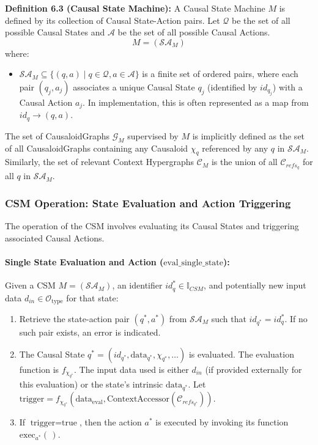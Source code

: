 \noindent\textbf{Definition 6.3 (Causal State Machine):} A Causal State Machine \( M \) is defined by its collection of Causal State-Action pairs. Let \(\mathcal{Q}\) be the set of all possible Causal States and \(\mathcal{A}\) be the set of all possible Causal Actions.
\[ M = (\mathcal{SA}_M) \]
where:
\begin{itemize}
    \item \( \mathcal{SA}_M \subseteq \{(q, a) \mid q \in \mathcal{Q}, a \in \mathcal{A}\} \) is a finite set of ordered pairs, where each pair \( (q_j, a_j) \) associates a unique Causal State \(q_j\) (identified by \(id_{q_j}\)) with a Causal Action \(a_j\). In implementation, this is often represented as a map from \(id_q \to (q, a)\).
\end{itemize}
The set of CausaloidGraphs \(\mathcal{G}_M\) supervised by \(M\) is implicitly defined as the set of all CausaloidGraphs containing any Causaloid \(\chi_q\) referenced by any \(q\) in \(\mathcal{SA}_M\). Similarly, the set of relevant Context Hypergraphs \(\mathcal{C}_M\) is the union of all \(\mathcal{C}_{refs_q}\) for all \(q\) in \(\mathcal{SA}_M\).

    \subsubsection[CSM Operation: State Evaluation and Action Triggering]{CSM Operation: State Evaluation and Action Triggering}
    \label{ssec:csm_operation_formal_merged}

    The operation of the CSM involves evaluating its Causal States and triggering associated Causal Actions.

    \paragraph{Single State Evaluation and Action (\(\text{eval\_single\_state}\)):}
    Given a CSM \(M = (\mathcal{SA}_M)\), an identifier \(id_q^* \in \mathbb{I}_{CSM}\), and potentially new input data \(d_{in} \in \mathcal{O}_{\text{type}}\) for that state:
    \begin{enumerate}
        \item Retrieve the state-action pair \((q^*, a^*)\) from \(\mathcal{SA}_M\) such that \(id_{q^*} = id_q^*\). If no such pair exists, an error is indicated.
        \item The Causal State \(q^* = (id_{q^*}, \text{data}_{q^*}, \chi_{q^*}, \dots)\) is evaluated. The evaluation function is \(f_{\chi_{q^*}}\). The input data used is either \(d_{in}\) (if provided externally for this evaluation) or the state's intrinsic \(\text{data}_{q^*}\).
        Let \( \text{trigger} = f_{\chi_{q^*}}(\text{data}_{\text{eval}}, \text{ContextAccessor}(\mathcal{C}_{refs_{q^*}})) \).
        \item If \(\text{trigger} = \text{true}\), then the action \(a^*\) is executed by invoking its function \(\text{exec}_{a^*}(\,)\).
    \end{enumerate}


